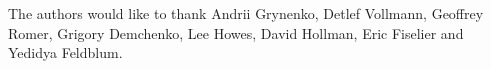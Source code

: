 
The authors would like to thank Andrii Grynenko, Detlef Vollmann, Geoffrey Romer,
Grigory Demchenko, Lee Howes, David Hollman, Eric Fiselier and Yedidya Feldblum.
